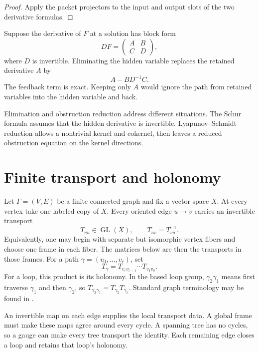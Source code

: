 \begin{proof}
Apply the packet projectors to the input and output slots of the two derivative formulas.
\end{proof}


\begin{example}\label{ex:finite_schur}
Suppose the derivative of $F$ at a solution has block form
\[
DF=
\begin{pmatrix}
A&B\\
C&D
\end{pmatrix},
\]
where $D$ is invertible.  Eliminating the hidden variable replaces the retained derivative $A$ by
\[
A-BD^{-1}C.
\]
The feedback term is exact.  Keeping only $A$ would ignore the path from retained variables into the hidden variable and back.
\end{example}

\begin{remark}\label{rem:elimination_vs_obstruction}
Elimination and obstruction reduction address different situations.  The Schur formula assumes that the hidden derivative is invertible.  Lyapunov--Schmidt reduction allows a nontrivial kernel and cokernel, then leaves a reduced obstruction equation on the kernel directions.
\end{remark}

\section{Finite transport and holonomy}\label{sec:finite_holonomy}

Let $\Gamma=(V,E)$ be a finite connected graph and fix a vector space $X$.  At every vertex take one labeled copy of $X$.  Every oriented edge $u\to v$ carries an invertible transport
\[
T_{vu}\in\operatorname{GL}(X),
\qquad
T_{uv}=T_{vu}^{-1}.
\]
Equivalently, one may begin with separate but isomorphic vertex fibers and choose one frame in each fiber.  The matrices below are then the transports in those frames.  For a path $\gamma=(v_0,\ldots,v_r)$, set
\[
T_\gamma
=
T_{v_rv_{r-1}}\cdots T_{v_1v_0}.
\]
For a loop, this product is its holonomy. In the based loop group, $\gamma_2\gamma_1$ means first traverse $\gamma_1$ and then $\gamma_2$, so $T_{\gamma_2\gamma_1}=T_{\gamma_2}T_{\gamma_1}$.  Standard graph terminology may be found in \cite{GrossTucker1987}.

An invertible map on each edge supplies the local transport data. A global frame must make these maps agree around every cycle. A spanning tree has no cycles, so a gauge can make every tree transport the identity. Each remaining edge closes a loop and retains that loop's holonomy.

